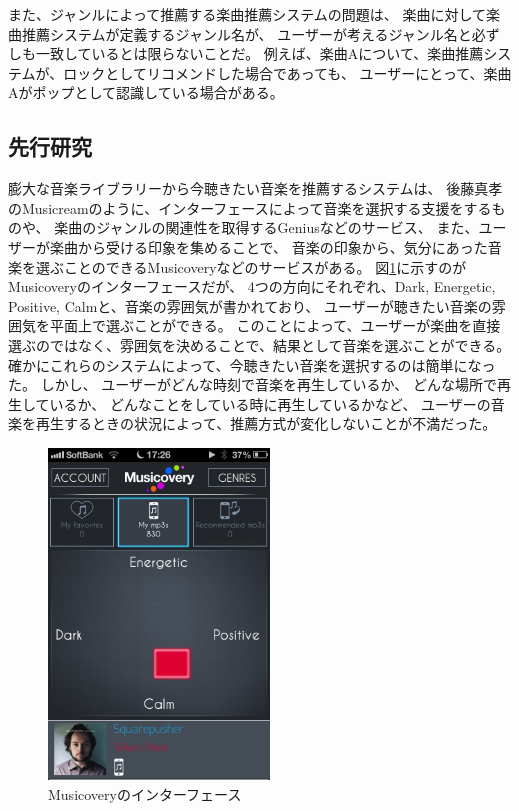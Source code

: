 \documentclass[11pt, onecolumn]{jsarticle}
\begin{document}
また、ジャンルによって推薦する楽曲推薦システムの問題は、
楽曲に対して楽曲推薦システムが定義するジャンル名が、
ユーザーが考えるジャンル名と必ずしも一致しているとは限らないことだ。
例えば、楽曲Aについて、楽曲推薦システムが、ロックとしてリコメンドした場合であっても、
ユーザーにとって、楽曲Aがポップとして認識している場合がある。


\subsection{先行研究}
膨大な音楽ライブラリーから今聴きたい音楽を推薦するシステムは、
後藤真孝のMusicreamのように、インターフェースによって音楽を選択する支援をするものや、
楽曲のジャンルの関連性を取得するGeniusなどのサービス、
また、ユーザーが楽曲から受ける印象を集めることで、
音楽の印象から、気分にあった音楽を選ぶことのできるMusicoveryなどのサービスがある。
図\ref{musicovery_interface}に示すのがMusicoveryのインターフェースだが、
4つの方向にそれぞれ、Dark, Energetic, Positive, Calmと、音楽の雰囲気が書かれており、
ユーザーが聴きたい音楽の雰囲気を平面上で選ぶことができる。
このことによって、ユーザーが楽曲を直接選ぶのではなく、雰囲気を決めることで、結果として音楽を選ぶことができる。
確かにこれらのシステムによって、今聴きたい音楽を選択するのは簡単になった。
しかし、
ユーザーがどんな時刻で音楽を再生しているか、
どんな場所で再生しているか、
どんなことをしている時に再生しているかなど、
ユーザーの音楽を再生するときの状況によって、推薦方式が変化しないことが不満だった。

\begin{figure}[h]
\begin{center}
\includegraphics[width=5.866cm]{musicovery.png}
\caption{Musicoveryのインターフェース}
\label{musicovery_interface}
\end{center}
\end{figure}
\end{document}
